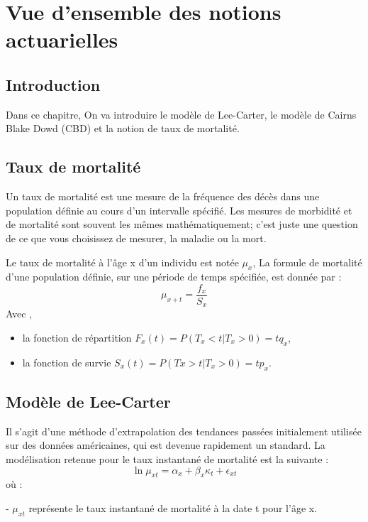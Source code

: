 \chapter{Vue d'ensemble des notions actuarielles}
\section*{Introduction}
Dans ce chapitre, On va introduire le modèle de Lee-Carter, le modèle de Cairns Blake Dowd (CBD) et la notion de taux de mortalité.
\section{Taux de mortalité}
\par Un taux de mortalité est une mesure de la fréquence des décès dans une population définie au cours d'un intervalle spécifié. Les mesures de morbidité et de mortalité sont souvent les mêmes mathématiquement; c'est juste une question de ce que vous choisissez de mesurer, la maladie ou la mort. 
\par Le taux de mortalité à l’âge x d’un individu est notée $\mu_x$, La formule de mortalité d'une population définie, sur une période de temps spécifiée, est donnée par \cite{cours} :
\begin{equation}
    \mu_{x+t} = \frac{f_x}{S_x}
\end{equation}
  Avec , 
    
    \begin{itemize}
        \item la fonction de répartition $F_x(t) = P(T_x < t | T_x > 0) = tq_x$,
        \item la fonction de survie $S_x(t) = P(Tx > t | T_x > 0) = tp_x$.
    \end{itemize}

\section{Modèle de Lee-Carter}
Il s’agit d’une méthode d’extrapolation des tendances passées initialement utilisée
sur des données américaines, qui est devenue rapidement un standard. La
modélisation retenue pour le taux instantané de mortalité est la suivante : 
\begin{equation}
\ln \mu_{xt} = \alpha_x + \beta_x\kappa_t + \epsilon_{xt}
\end{equation}
où :

- \textbf{$\mu_{xt}$} représente le taux instantané de mortalité à la date t pour l’âge x.


